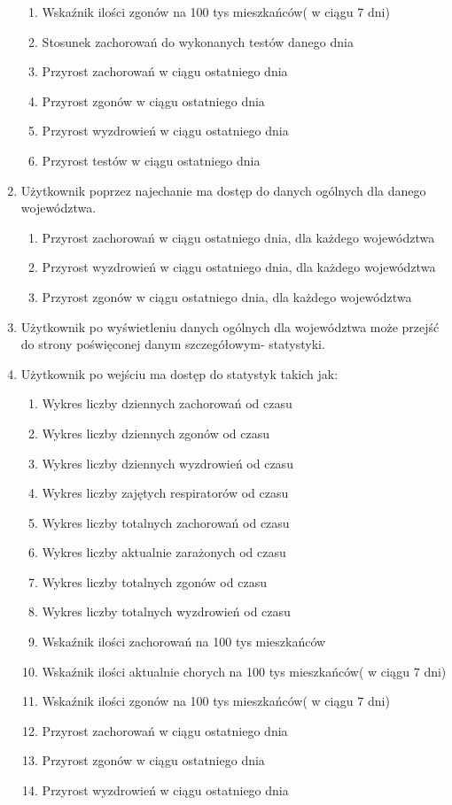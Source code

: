\documentclass[13pt]{article}
\begin{document}
\begin{enumerate}
\begin{enumerate}
\item Wskaźnik ilości zgonów na 100 tys mieszkańców( w ciągu 7 dni)
\item Stosunek zachorowań do wykonanych testów danego dnia
\item Przyrost zachorowań w ciągu ostatniego dnia
\item Przyrost zgonów w ciągu ostatniego dnia
\item Przyrost wyzdrowień w ciągu ostatniego dnia
\item Przyrost testów w ciągu ostatniego dnia
\end{enumerate}
\item Użytkownik poprzez najechanie ma dostęp do danych ogólnych dla danego województwa.
\begin{enumerate}
\item Przyrost zachorowań w ciągu ostatniego dnia, dla każdego województwa
\item Przyrost wyzdrowień w ciągu ostatniego dnia, dla każdego województwa
\item Przyrost zgonów w ciągu ostatniego dnia, dla każdego województwa
\end{enumerate}

\item Użytkownik po wyświetleniu danych ogólnych dla województwa może przejść do strony poświęconej danym szczegółowym- statystyki.
\item Użytkownik po wejściu ma dostęp do statystyk takich jak:
\begin{enumerate}
\item Wykres liczby dziennych zachorowań od czasu
\item Wykres liczby dziennych zgonów od czasu
\item Wykres liczby dziennych wyzdrowień od czasu
\item Wykres liczby zajętych respiratorów od czasu
\item Wykres liczby totalnych zachorowań od czasu
\item Wykres liczby aktualnie zarażonych od czasu
\item Wykres liczby totalnych zgonów od czasu
\item Wykres liczby totalnych wyzdrowień od czasu
\item Wskaźnik ilości zachorowań na 100 tys mieszkańców
\item Wskaźnik ilości aktualnie chorych na 100 tys mieszkańców( w ciągu 7 dni)
\item Wskaźnik ilości zgonów na 100 tys mieszkańców( w ciągu 7 dni)
\item Przyrost zachorowań w ciągu ostatniego dnia
\item Przyrost zgonów w ciągu ostatniego dnia
\item Przyrost wyzdrowień w ciągu ostatniego dnia
\end{enumerate}
\end{enumerate}
\newpage
\end{document}
